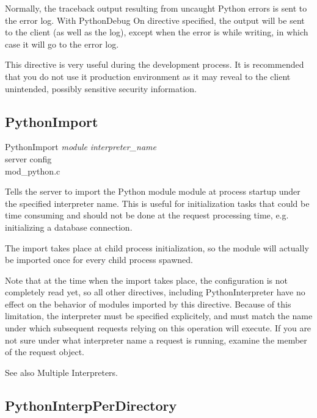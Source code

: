 Normally, the traceback output resulting from uncaught Python errors
is sent to the error log. With PythonDebug On directive specified, the
output will be sent to the client (as well as the log), except when
the error is  while writing, in which case it will go
to the error log.

This directive is very useful during the development process. It is
recommended that you do not use it production environment as it may
reveal to the client unintended, possibly sensitive security
information.

\subsection{PythonImport\label{dir-other-pi}}

PythonImport \emph{module} \emph{interpreter_name}\\
server config\\
mod_python.c

Tells the server to import the Python module module at process startup
under the specified interpreter name. This is useful for
initialization tasks that could be time consuming and should not be
done at the request processing time, e.g. initializing a database
connection.

The import takes place at child process initialization, so the module
will actually be imported once for every child process spawned.

Note that at the time when the import takes place, the configuration
is not completely read yet, so all other directives, including
PythonInterpreter have no effect on the behavior of modules imported
by this directive. Because of this limitation, the interpreter must be
specified explicitely, and must match the name under which subsequent
requests relying on this operation will execute. If you are not sure
under what interpreter name a request is running, examine the
 member of the request object.

See also Multiple Interpreters. 

\subsection{PythonInterpPerDirectory\label{dir-other-ipd}}

